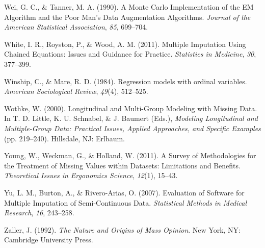 \documentclass[12pt,econ]{sources/authesis}
\begin{document}
\leavevmode\hypertarget{ref-wei_1990_monte}{}%
Wei, G. C., \& Tanner, M. A. (1990). A Monte Carlo Implementation of the EM Algorithm and the Poor Man's Data Augmentation Algorithms. \emph{Journal of the American Statistical Association}, \emph{85}, 699--704.

\leavevmode\hypertarget{ref-white_2011_multiple}{}%
White, I. R., Royston, P., \& Wood, A. M. (2011). Multiple Imputation Using Chained Equations: Issues and Guidance for Practice. \emph{Statistics in Medicine}, \emph{30}, 377--399.

\leavevmode\hypertarget{ref-winship_1984_regression}{}%
Winship, C., \& Mare, R. D. (1984). Regression models with ordinal variables. \emph{American Sociological Review}, \emph{49}(4), 512--525.

\leavevmode\hypertarget{ref-wothke_2000_longitudinal}{}%
Wothke, W. (2000). Longitudinal and Multi-Group Modeling with Missing Data. In T. D. Little, K. U. Schnabel, \& J. Baumert (Eds.), \emph{Modeling Longitudinal and Multiple-Group Data: Practical Issues, Applied Approaches, and Specific Examples} (pp. 219--240). Hillsdale, NJ: Erlbaum.

\leavevmode\hypertarget{ref-young_2011_survey}{}%
Young, W., Weckman, G., \& Holland, W. (2011). A Survey of Methodologies for the Treatment of Missing Values within Datasets: Limitations and Benefits. \emph{Theoretical Issues in Ergonomics Science}, \emph{12}(1), 15--43.

\leavevmode\hypertarget{ref-yu_2007_evaluation}{}%
Yu, L. M., Burton, A., \& Rivero-Arias, O. (2007). Evaluation of Software for Multiple Imputation of Semi-Continuous Data. \emph{Statistical Methods in Medical Research}, \emph{16}, 243--258.

\leavevmode\hypertarget{ref-zaller_nature_1992}{}%
Zaller, J. (1992). \emph{The Nature and Origins of Mass Opinion}. New York, NY: Cambridge University Press.
\end{document}
